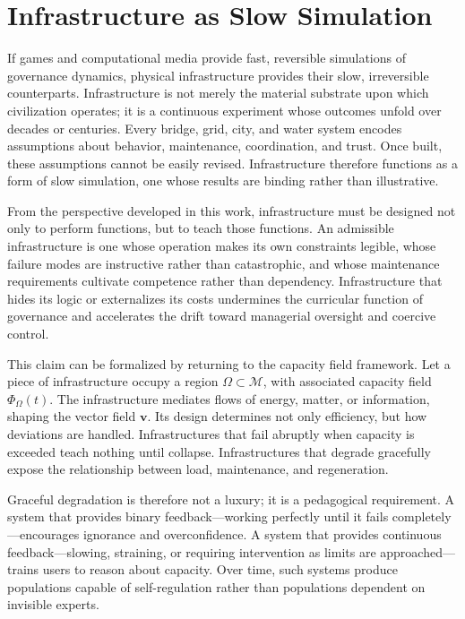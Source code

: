 \documentclass[12pt,oneside]{book}
\begin{document}
\chapter{Infrastructure as Slow Simulation}

If games and computational media provide fast, reversible simulations of governance dynamics, physical infrastructure provides their slow, irreversible counterparts. Infrastructure is not merely the material substrate upon which civilization operates; it is a continuous experiment whose outcomes unfold over decades or centuries. Every bridge, grid, city, and water system encodes assumptions about behavior, maintenance, coordination, and trust. Once built, these assumptions cannot be easily revised. Infrastructure therefore functions as a form of slow simulation, one whose results are binding rather than illustrative.

From the perspective developed in this work, infrastructure must be designed not only to perform functions, but to teach those functions. An admissible infrastructure is one whose operation makes its own constraints legible, whose failure modes are instructive rather than catastrophic, and whose maintenance requirements cultivate competence rather than dependency. Infrastructure that hides its logic or externalizes its costs undermines the curricular function of governance and accelerates the drift toward managerial oversight and coercive control.

This claim can be formalized by returning to the capacity field framework. Let a piece of infrastructure occupy a region \(\Omega \subset \mathcal{M}\), with associated capacity field \(\Phi_\Omega(t)\). The infrastructure mediates flows of energy, matter, or information, shaping the vector field \(\mathbf{v}\). Its design determines not only efficiency, but how deviations are handled. Infrastructures that fail abruptly when capacity is exceeded teach nothing until collapse. Infrastructures that degrade gracefully expose the relationship between load, maintenance, and regeneration.

Graceful degradation is therefore not a luxury; it is a pedagogical requirement. A system that provides binary feedback—working perfectly until it fails completely—encourages ignorance and overconfidence. A system that provides continuous feedback—slowing, straining, or requiring intervention as limits are approached—trains users to reason about capacity. Over time, such systems produce populations capable of self-regulation rather than populations dependent on invisible experts.
\end{document}
